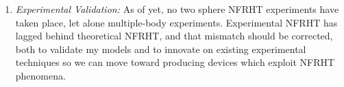 \begin{enumerate}
\item \textit{Experimental Validation:} As of yet, no two sphere NFRHT experiments have taken place, let alone multiple-body experiments. Experimental NFRHT has lagged behind theoretical NFRHT, and that mismatch should be corrected, both to validate my models and to innovate on existing experimental techniques so we can move toward producing devices which exploit NFRHT phenomena.
\end{enumerate}





